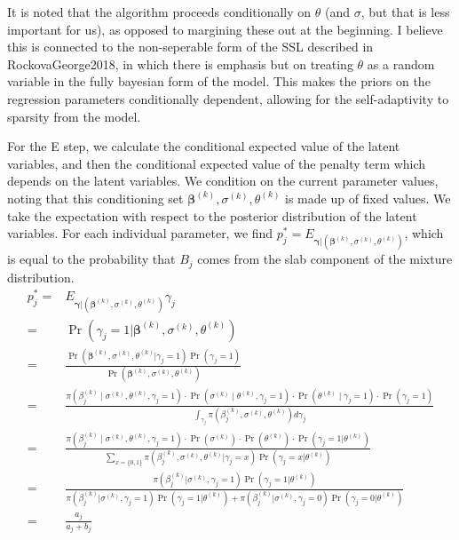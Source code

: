 \documentclass[11pt,a4paper]{article}
\begin{document}
It is noted that the algorithm proceeds conditionally on $\theta$ (and $\sigma$, but that is less important for us), as opposed to margining these out at the beginning. I believe this is connected to the non-seperable form of the SSL described in RockovaGeorge2018, in which there is emphasis but on treating $\theta$ as a random variable in the fully bayesian form of the model. This makes the priors on the regression parameters conditionally dependent, allowing for the self-adaptivity to sparsity from the model.

For the E step, we calculate the conditional expected value of the latent variables, and then the conditional expected value of the penalty term which depends on the latent variables. We condition on the current parameter values, noting that this conditioning set $\boldsymbol{\beta}^{(k)},\sigma^{(k)}, \theta^{(k)}$ is made up of fixed values. We take the expectation with respect to the posterior distribution of the latent variables. For each individual parameter, we find $p^*_j = E_{\boldsymbol{\gamma}|(\boldsymbol{\beta}^{(k)},\sigma^{(k)}, \theta^{(k)})}$, which is equal to the probability that $B_j$ comes from the slab component of the mixture distribution. 
\begin{align*}
     p^*_j = &E_{\boldsymbol{\gamma}|(\boldsymbol{\beta}^{(k)},\sigma^{(k)}, \theta^{(k)})}\gamma_j\\
     =& \Pr(\gamma_j = 1 | \boldsymbol{\beta}^{(k)},\sigma^{(k)}, \theta^{(k)})
     \\= &   \frac{\Pr(\boldsymbol{\beta}^{(k)},\sigma^{(k)}, \theta^{(k)}|\gamma_j =1 )\Pr(\gamma_j = 1)}{\Pr(\boldsymbol{\beta}^{(k)},\sigma^{(k)}, \theta^{(k)})}
     \\=  &  \frac{\pi(\beta_j^{(k)} \mid \sigma^{(k)}, \theta^{(k)}, \gamma_j = 1) \cdot \Pr(\sigma^{(k)} \mid \theta^{(k)}, \gamma_j = 1) \cdot \Pr(\theta^{(k)} \mid \gamma_j = 1) \cdot \Pr(\gamma_j = 1)}{\int_{\gamma_j} \pi(\beta_j^{(k)},\sigma^{(k)}, \theta^{(k)})d\gamma_j}
     \\ = &  \frac{\pi(\beta_j^{(k)} \mid \sigma^{(k)}, \theta^{(k)}, \gamma_j = 1) \cdot \Pr(\sigma^{(k)}) \cdot \Pr(\theta^{(k)}) \cdot \Pr( \gamma_j = 1|\theta^{(k)}) }{\sum_{x = \{0,1\}} \pi(\beta_j^{(k)},\sigma^{(k)}, \theta^{(k)}| \gamma_j =x ) \Pr(\gamma_j = x |\theta^{(k)})}
     \\ = &  \frac{\pi(\beta_j^{(k)}|\sigma^{(k)}, \gamma_j =1)\Pr(\gamma_j = 1 | \theta^{(k)})}{\pi(\beta_j^{(k)}|\sigma^{(k)}, \gamma_j = 1)\Pr(\gamma_j = 1 | \theta^{(k)}) + \pi(\beta_j^{(k)}|\sigma^{(k)}, \gamma_j = 0)\Pr(\gamma_j = 0 | \theta^{(k)})}
     \\=& \frac{a_j}{a_j + b_j}
\end{align*}
\end{document}
